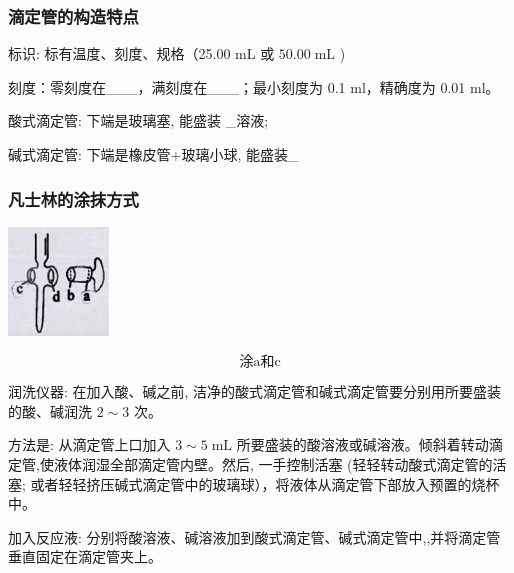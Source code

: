 \documentclass[10pt,cn]{elegantbook}
\begin{document}
	
	\subsubsection{滴定管的构造特点}
	
		标识: 标有温度、刻度、规格（25.00 mL 或 \({50.00}\mathrm{\;{mL}}\) )%
	
	刻度：零刻度在\_\_\_，满刻度在\_\_\_；最小刻度为 0.1 ml，精确度为 0.01 ml。%
	
	酸式滴定管: 下端是玻璃塞, 能盛装 \_溶液;
	
	碱式滴定管: 下端是橡皮管+玻璃小球, 能盛装\_
	
	
	
	
	\subsubsection{凡士林的涂抹方式}
	
	\begin{center}
		\includegraphics[max width=0.2\textwidth]{image/c3-1.jpg}
	\end{center}
	
		\[\mbox{涂a和c}\]
	
	
	润洗仪器: 在加入酸、碱之前, 洁净的酸式滴定管和碱式滴定管要分别用所要盛装的酸、碱润洗 \(2 \sim 3\) 次。
	
	方法是: 从滴定管上口加入 \(3 \sim 5\mathrm{\;{mL}}\) 所要盛装的酸溶液或碱溶液。倾斜着转动滴定管,使液体润湿全部滴定管内壁。然后, 一手控制活塞 (轻轻转动酸式滴定管的活塞; 或者轻轻挤压碱式滴定管中的玻璃球），将液体从滴定管下部放入预置的烧杯中。
	
	加入反应液: 分别将酸溶液、碱溶液加到酸式滴定管、碱式滴定管中,,并将滴定管垂直固定在滴定管夹上。
	
\end{document}
